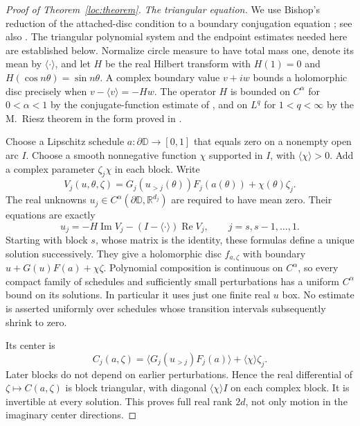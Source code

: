 \begin{proof}[Proof of Theorem~\ref{loc:theorem}]
\emph{The triangular equation.}
We use Bishop's reduction of the attached-disc condition to a
boundary conjugation equation \cite{Bishop1965}; see also
\cite[\S2, equation~(2.1) and Proposition~2.1]{HillTaiani1978}.
The triangular polynomial system and the endpoint estimates needed
here are established below. Normalize circle measure to have total mass one, denote its mean by
$\langle\cdot\rangle$, and let $H$ be the real Hilbert transform with
$H(1)=0$ and $H(\cos n\theta)=\sin n\theta$.  A complex boundary value
$v+iw$ bounds a holomorphic disc precisely when
$v-\langle v\rangle=-Hw$.  The operator $H$ is bounded on $C^\alpha$
for $0<\alpha<1$ by the conjugate-function estimate of
\cite[pp.~100--102]{Priwaloff1916}, and on $L^q$ for $1<q<\infty$
by the M.~Riesz theorem in the form proved in
\cite[equation~(0.1) and \S\S1--2]{Essen1984}.

Choose a Lipschitz schedule $a:\partial\mathbb D\to[0,1]$ that equals
zero on a nonempty open arc $I$.  Choose a smooth nonnegative function
$\chi$ supported in $I$, with $\langle\chi\rangle>0$.  Add a complex
parameter $\zeta_j\chi$ in each block.  Write
\[
 V_j(u,\theta,\zeta)
     =G_j(u_{>j}(\theta))F_j(a(\theta))+\chi(\theta)\zeta_j.
\]
The real unknowns $u_j\in C^\alpha(\partial\mathbb D,\mathbb R^{d_j})$
are required to have mean zero.  Their equations are exactly
\begin{equation}\label{loc:bishop}
 u_j=-H\operatorname{Im}V_j
       -(I-\langle\cdot\rangle)\operatorname{Re}V_j,
                       \qquad j=s,s-1,\ldots,1.
\end{equation}
Starting with block $s$, whose matrix is the identity, these formulas
define a unique solution successively.  They give a holomorphic disc
$f_{a,\zeta}$ with boundary $u+G(u)F(a)+\chi\zeta$.  Polynomial
composition is continuous on $C^\alpha$, so every compact family of
schedules and sufficiently small perturbations has a uniform
$C^\alpha$ bound on its solutions.  In particular it uses just one
finite real $u$ box.  No estimate is asserted uniformly over schedules
whose transition intervals subsequently shrink to zero.

Its center is
\begin{equation}\label{loc:center}
 C_j(a,\zeta)=\langle G_j(u_{>j})F_j(a)\rangle
                       +\langle\chi\rangle\zeta_j.
\end{equation}
Later blocks do not depend on earlier perturbations.  Hence the real
differential of $\zeta\mapsto C(a,\zeta)$ is block triangular, with
diagonal $\langle\chi\rangle I$ on each complex block.  It is invertible
at every solution.  This proves full real rank $2d$, not only motion
in the imaginary center directions.


\end{proof}
